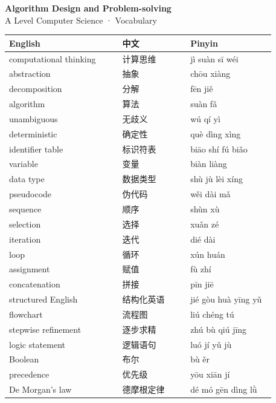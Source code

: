 \documentclass[11pt]{article}
\begin{document}
\begin{center}
  {\LARGE\bfseries Algorithm Design and Problem-solving}\\[0.35em]
  {\large A Level Computer Science · Vocabulary}
\end{center}
\vspace{0.6em}

\begin{longtable}{@{}p{0.40\linewidth}p{0.24\linewidth}p{0.30\linewidth}@{}}
\toprule
\textbf{English} & \textbf{中文} & \textbf{Pinyin} \\
\midrule
\endhead
\bottomrule
\endlastfoot
computational thinking & 计算思维 & jì suàn sī wéi \\
abstraction & 抽象 & chōu xiàng \\
decomposition & 分解 & fēn jiě \\
algorithm & 算法 & suàn fǎ \\
unambiguous & 无歧义 & wú qí yì \\
deterministic & 确定性 & què dìng xìng \\
identifier table & 标识符表 & biāo shí fú biǎo \\
variable & 变量 & biàn liàng \\
data type & 数据类型 & shù jù lèi xíng \\
pseudocode & 伪代码 & wěi dài mǎ \\
sequence & 顺序 & shùn xù \\
selection & 选择 & xuǎn zé \\
iteration & 迭代 & dié dài \\
loop & 循环 & xún huán \\
assignment & 赋值 & fù zhí \\
concatenation & 拼接 & pīn jiē \\
structured English & 结构化英语 & jié gòu huà yīng yǔ \\
flowchart & 流程图 & liú chéng tú \\
stepwise refinement & 逐步求精 & zhú bù qiú jīng \\
logic statement & 逻辑语句 & luó jí yǔ jù \\
Boolean & 布尔 & bù ěr \\
precedence & 优先级 & yōu xiān jí \\
De Morgan's law & 德摩根定律 & dé mó gēn dìng lǜ \\
\end{longtable}
\end{document}
